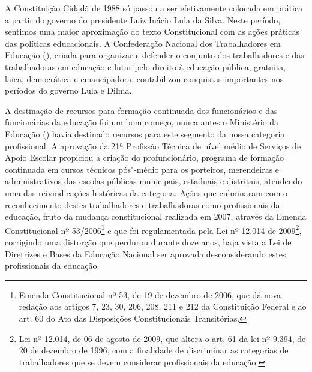 A Constituição Cidadã de 1988 só passou a ser efetivamente colocada em
prática a partir do governo do presidente Luiz Inácio Lula da Silva.
Neste período, sentimos uma maior aproximação do texto Constitucional
com as ações práticas das políticas educacionais. A Confederação
Nacional dos Trabalhadores em Educação (), criada para organizar e
defender o conjunto dos trabalhadores e das trabalhadoras em educação e
lutar pelo direito à educação pública, gratuita, laica, democrática e
emancipadora, contabilizou conquistas importantes nos períodos do
governo Lula e Dilma.

A destinação de recursos para formação continuada dos funcionários e das
funcionárias da educação foi um bom começo, nunca antes o Ministério da
Educação () havia destinado recursos para este segmento da nossa
categoria profissional. A aprovação da 21ª Profissão Técnica de nível
médio de Serviços de Apoio Escolar propiciou a criação do
profuncionário, programa
de formação continuada em cursos técnicos pós"-médio para os porteiros,
merendeiras e administrativos das escolas públicas municipais, estaduais
e distritais, atendendo uma das reivindicações históricas da categoria.
Ações que culminaram com o reconhecimento destes
trabalhadores e trabalhadoras como profissionais da
educação, fruto da mudança constitucional realizada em 2007, através da
Emenda Constitucional nº 53/2006\footnote{Emenda Constitucional
  nº 53, de 19 de dezembro de 2006, que dá nova redação aos artigos 7, 23,
  30, 206, 208, 211 e 212 da Constituição Federal e ao art. 60 do Ato
  das Disposições Constitucionais Transitórias.} e que foi regulamentada
pela Lei nº 12.014 de 2009\footnote{Lei nº 12.014, de 06 de
  agosto de 2009, que altera o art. 61 da lei nº 9.394, de 20 de dezembro
  de 1996, com a finalidade de discriminar as categorias de
  trabalhadores que se devem considerar profissionais da educação.},
corrigindo uma distorção que perdurou durante doze anos, haja vista a
Lei de Diretrizes e Bases da Educação Nacional ser aprovada
desconsiderando estes profissionais da educação.

